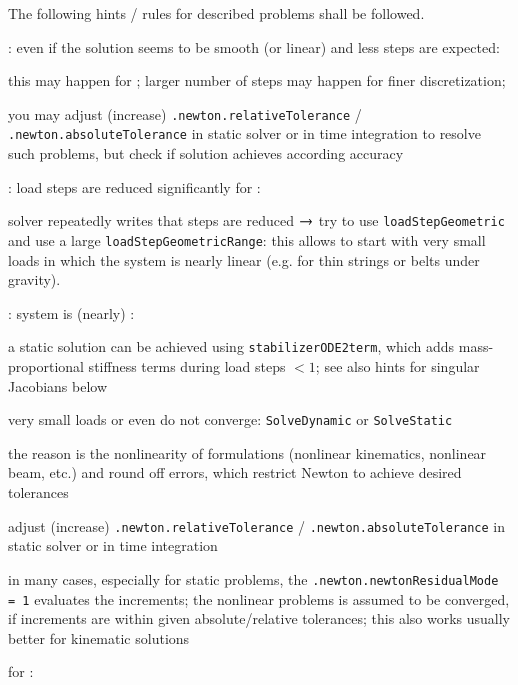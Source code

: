 \noindent The following hints / rules for described problems shall be followed.
\bi
  \item {}:  even if the solution seems to be smooth (or linear) and less steps are expected:
  \bi
  \item[$\ra$] this may happen for ; larger number of steps may happen for finer discretization; 
  \item[$\ra$] you may adjust (increase) \texttt{.newton.relativeTolerance} / \texttt{.newton.absoluteTolerance} in static solver or in time integration to resolve such problems, but check if solution achieves according accuracy
  \ei
  \item {}:  load steps are reduced significantly for : 
  \bi
  \item[$\ra$] solver repeatedly writes that steps are reduced $\ra$ try to use \texttt{loadStepGeometric} and use a large \texttt{loadStepGeometricRange}: this allows to start with very small loads in which the system is nearly linear (e.g. for thin strings or belts under gravity).
  \ei
  \item {}: system is (nearly) :
  \bi
  \item[$\ra$] a static solution can be achieved using \texttt{stabilizerODE2term}, which adds mass-proportional stiffness terms during load steps $< 1$; see also hints for singular Jacobians below
  \ei
  \item very small loads or even  do not converge: \texttt{SolveDynamic} or \texttt{SolveStatic} 
  \bi
  \item[$\ra$] the reason is the nonlinearity of formulations (nonlinear kinematics, nonlinear beam, etc.) and round off errors, which restrict Newton to achieve desired tolerances
  \item[$\ra$] adjust (increase) \texttt{.newton.relativeTolerance} / \texttt{.newton.absoluteTolerance} in static solver or in time integration
  \item[$\ra$] in many cases, especially for static problems, the \texttt{.newton.newtonResidualMode = 1} evaluates the increments; the nonlinear problems is assumed to be converged, if increments are within given absolute/relative tolerances; this also works usually better for kinematic solutions
  \ei
  \item for : 

